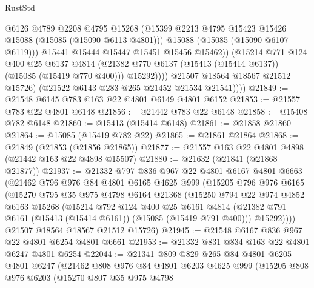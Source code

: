 \begin{lexlean}{RustStd}
\begin{coremodule}
                        @6126
                        @4789
                        @2208
                        @4795
                        @15268
                        (@15399 @2213 @4795 @15423 @15426 @15088 (@15085 (@15090 @6113 @4801)))
                        @15088
                        (@15085 (@15090 @6107 @6119)))
                      @15441
                      @15444
                      @15447
                      @15451
                      @15456
                      @15462))
                  (@15214
                    @771
                    @124
                    @400
                    @25
                    @6137
                    @4814
                    (@21382 @770 @6137 (@15413 (@15414 @6137)) (@15085 (@15419 @770 @400)))
                    @15292))))
            @21507
            @18564
            @18567
            @21512
            @15726)
          (@21522 @6143 @283 @265 @21452 @21534 @21541))))
@21849 := @21548 @6145 @783 @163 @22 @4801 @6149 @4801 @6152
@21853 := @21557 @783 @22 @4801 @6148
@21856 := @21442 @783 @22 @6148
@21858 := @15408 @782 @6148
@21860 := @15413 (@15414 @6148)
@21861 := @21858 @21860
@21864 := @15085 (@15419 @782 @22)
@21865 := @21861 @21864
@21868 := @21849 (@21853 (@21856 @21865))
@21877 := @21557 @163 @22 @4801 @4898 (@21442 @163 @22 @4898 @15507)
@21880 := @21632 (@21841 (@21868 @21877))
@21937 := @21332
    @797
    @836
    @967
    @22
    @4801
    @6167
    @4801
    @6663
    (@21462
      @796
      @976
      @84
      @4801
      @6165
      @4625
      @999
      (@15205
        @796
        @976
        @6165
        (@15270
          @795
          @35
          @975
          @4798
          @6164
          @21368
          (@15250
            @794
            @22
            @974
            @4852
            @6163
            @15268
            (@15214
              @792
              @124
              @400
              @25
              @6161
              @4814
              (@21382 @791 @6161 (@15413 (@15414 @6161)) (@15085 (@15419 @791 @400)))
              @15292))))
      @21507
      @18564
      @18567
      @21512
      @15726)
@21945 := @21548 @6167 @836 @967 @22 @4801 @6254 @4801 @6661
@21953 := @21332 @831 @834 @163 @22 @4801 @6247 @4801 @6254
@22044 := @21341
    @809
    @829
    @265
    @84
    @4801
    @6205
    @4801
    @6247
    (@21462
      @808
      @976
      @84
      @4801
      @6203
      @4625
      @999
      (@15205
        @808
        @976
        @6203
        (@15270
          @807
          @35
          @975
          @4798

\end{coremodule}
\end{lexlean}
